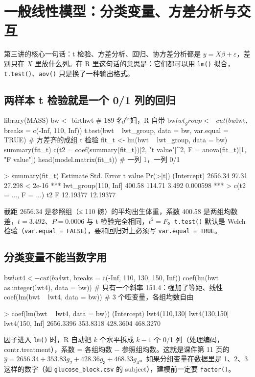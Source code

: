 \section{一般线性模型：分类变量、方差分析与交互}

第三讲的核心一句话：t 检验、方差分析、回归、协方差分析都是 $y=X\beta+\varepsilon$，差别只在 $X$ 里放什么列。在 R 里这句话的意思是：它们都可以用 \Verb|lm()| 拟合，\Verb|t.test()|、\Verb|aov()| 只是换了一种输出格式。

\subsection{两样本 t 检验就是一个 0/1 列的回归}
\begin{RCode}
library(MASS)
bw <- birthwt                                          # 189 名产妇，R 自带
bw$lwt_group <- cut(bw$lwt, breaks = c(-Inf, 110, Inf))
t.test(bwt ~ lwt_group, data = bw, var.equal = TRUE)    # 方差齐的成组 t 检验
fit_t <- lm(bwt ~ lwt_group, data = bw)
summary(fit_t)
c(t2 = coef(summary(fit_t))[2, "t value"]^2, F = anova(fit_t)[1, "F value"])
head(model.matrix(fit_t))                              # 一列 1，一列 0/1
\end{RCode}
\begin{ROut}
> summary(fit_t)
                    Estimate Std. Error t value Pr(>|t|)
(Intercept)          2656.34      97.31  27.298  < 2e-16 ***
lwt_group(110, Inf]   400.58     114.71   3.492 0.000598 ***
> c(t2 = ..., F = ...)
      t2        F
12.19377 12.19377
\end{ROut}
截距 2656.34 是参照组（≤ 110 磅）的平均出生体重，系数 400.58 是两组均数差，$t=3.492$、$P=0.0006$ 与 t 检验完全相同，$t^2=F$。\Verb|t.test()| 默认是 Welch 检验（\Verb|var.equal = FALSE|），要和回归对上必须写 \Verb|var.equal = TRUE|。

\subsection{分类变量不能当数字用}
\begin{RCode}[R · 四组：编成 1/2/3/4 与哑变量的区别]
bw$lwt4 <- cut(bw$lwt, breaks = c(-Inf, 110, 130, 150, Inf))
coef(lm(bwt ~ as.integer(lwt4), data = bw))   # 只有一个斜率 151.4：强加了等距、线性
coef(lm(bwt ~ lwt4, data = bw))               # 3 个哑变量，各组均数自由
\end{RCode}
\begin{ROut}
> coef(lm(bwt ~ lwt4, data = bw))
   (Intercept)  lwt4(110,130]  lwt4(130,150] lwt4(150, Inf]
     2656.3396       353.8318       428.3604       468.3270
\end{ROut}
因子进入 \Verb|lm()| 时，R 自动把 $k$ 个水平拆成 $k-1$ 个 0/1 列（处理编码，contr.treatment），系数 = 各组均数 − 参照组均数。这就是课件第 11 页的 $\hat y=2656.34+353.83g_2+428.36g_3+468.33g_4$。如果分组变量在数据里是 1、2、3 这样的数字（如 \Verb|glucose_block.csv| 的 subject），建模前一定要 \Verb|factor()|。

